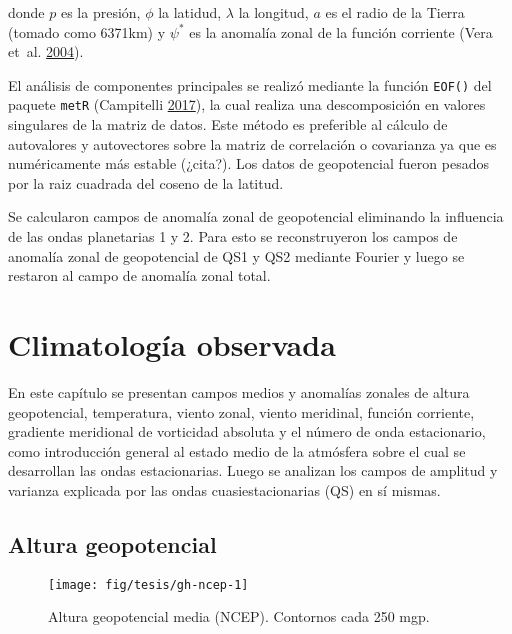 \documentclass[spanish,a4paper,12p]{book}
\begin{document}
donde \(p\) es la presión, \(\phi\) la latidud, \(\lambda\) la longitud,
\(a\) es el radio de la Tierra (tomado como 6371km) y \(\psi^*\) es la
anomalía zonal de la función corriente (Vera et~al.
\protect\hyperlink{ref-Vera2004}{2004}).

El análisis de componentes principales se realizó mediante la función
\texttt{EOF()} del paquete \texttt{metR} (Campitelli
\protect\hyperlink{ref-R-metR}{2017}), la cual realiza una
descomposición en valores singulares de la matriz de datos. Este método
es preferible al cálculo de autovalores y autovectores sobre la matriz
de correlación o covarianza ya que es numéricamente más estable
(¿cita?). Los datos de geopotencial fueron pesados por la raiz cuadrada
del coseno de la latitud.

Se calcularon campos de anomalía zonal de geopotencial eliminando la
influencia de las ondas planetarias 1 y 2. Para esto se reconstruyeron
los campos de anomalía zonal de geopotencial de QS1 y QS2 mediante
Fourier y luego se restaron al campo de anomalía zonal total.

\chapter{Climatología observada}\label{climatologia-observada}

En este capítulo se presentan campos medios y anomalías zonales de
altura geopotencial, temperatura, viento zonal, viento meridinal,
función corriente, gradiente meridional de vorticidad absoluta y el
número de onda estacionario, como introducción general al estado medio
de la atmósfera sobre el cual se desarrollan las ondas estacionarias.
Luego se analizan los campos de amplitud y varianza explicada por las
ondas cuasiestacionarias (QS) en sí mismas.

\section{Altura geopotencial}\label{altura-geopotencial}

\begin{landscape}\begin{figure}

{\centering \texttt{[image: fig/tesis/gh-ncep-1]} 

}

\caption{Altura geopotencial media (NCEP). Contornos cada 250 mgp.}\label{fig:gh-ncep}
\end{figure}
\end{landscape}
\end{document}
